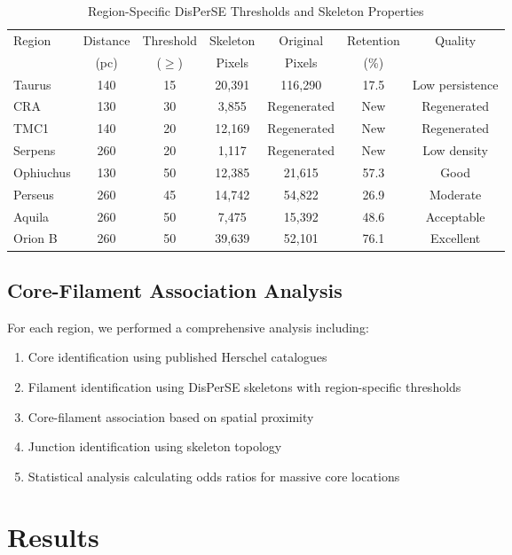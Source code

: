 \documentclass[11pt,a4paper]{article}
\begin{document}
\begin{table}[H]
\centering
\caption{Region-Specific DisPerSE Thresholds and Skeleton Properties}
\begin{tabular}{lcccccc}
\toprule
Region & Distance & Threshold & Skeleton & Original & Retention & Quality \\
      & (pc)   & ($\ge$) & Pixels  & Pixels  & (\%)  & \\
\midrule
Taurus   & 140     & 15  & 20,391   & 116,290  & 17.5  & Low persistence \\
CRA      & 130     & 30  & 3,855    & Regenerated & New     & Regenerated \\
TMC1     & 140     & 20  & 12,169   & Regenerated & New     & Regenerated \\
Serpens  & 260     & 20  & 1,117    & Regenerated & New     & Low density \\
Ophiuchus& 130     & 50  & 12,385   & 21,615  & 57.3   & Good \\
Perseus  & 260     & 45  & 14,742   & 54,822  & 26.9   & Moderate \\
Aquila   & 260     & 50  & 7,475    & 15,392  & 48.6   & Acceptable \\
Orion B  & 260     & 50  & 39,639   & 52,101  & 76.1   & Excellent \\
\bottomrule
\end{tabular}
\end{table}

\subsection{Core-Filament Association Analysis}

For each region, we performed a comprehensive analysis including:
\begin{enumerate}
    \item Core identification using published Herschel catalogues
    \item Filament identification using DisPerSE skeletons with region-specific thresholds
    \item Core-filament association based on spatial proximity
    \item Junction identification using skeleton topology
    \item Statistical analysis calculating odds ratios for massive core locations
\end{enumerate}

\section{Results}
\end{document}
